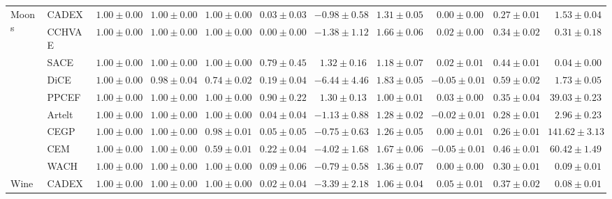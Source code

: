 \begin{table}[ht]
\begin{center}
\begin{sc}
\begin{scriptsize}
\begin{tabular}{l|l|rrrrrrrrr}
\multirow{9}{*}{Moons} & CADEX & $\boldsymbol{1.00\pm{0.00}}$ & $\boldsymbol{1.00\pm{0.00}}$ & $\boldsymbol{1.00\pm{0.00}}$ & $0.03\pm{0.03}$ & $-0.98\pm{0.58}$ & $1.31\pm{0.05}$ & $0.00\pm{0.00}$ & $0.27\pm{0.01}$ & $1.53\pm{0.04}$ \\
 & CCHVAE & $\boldsymbol{1.00\pm{0.00}}$ & $\boldsymbol{1.00\pm{0.00}}$ & $\boldsymbol{1.00\pm{0.00}}$ & $0.00\pm{0.00}$ & $-1.38\pm{1.12}$ & $1.66\pm{0.06}$ & $0.02\pm{0.00}$ & $0.34\pm{0.02}$ & $0.31\pm{0.18}$ \\
 & SACE & $\boldsymbol{1.00\pm{0.00}}$ & $\boldsymbol{1.00\pm{0.00}}$ & $\boldsymbol{1.00\pm{0.00}}$ & $0.79\pm{0.45}$ & $\boldsymbol{1.32\pm{0.16}}$ & $1.18\pm{0.07}$ & $0.02\pm{0.01}$ & $0.44\pm{0.01}$ & $\boldsymbol{0.04\pm{0.00}}$ \\
 & DiCE & $\boldsymbol{1.00\pm{0.00}}$ & $0.98\pm{0.04}$ & $0.74\pm{0.02}$ & $0.19\pm{0.04}$ & $-6.44\pm{4.46}$ & $1.83\pm{0.05}$ & $-0.05\pm{0.01}$ & $0.59\pm{0.02}$ & $1.73\pm{0.05}$ \\
 & PPCEF & $\boldsymbol{1.00\pm{0.00}}$ & $\boldsymbol{1.00\pm{0.00}}$ & $\boldsymbol{1.00\pm{0.00}}$ & $\boldsymbol{0.90\pm{0.22}}$ & $1.30\pm{0.13}$ & $\boldsymbol{1.00\pm{0.01}}$ & $\boldsymbol{0.03\pm{0.00}}$ & $0.35\pm{0.04}$ & $39.03\pm{0.23}$ \\
 & Artelt & $\boldsymbol{1.00\pm{0.00}}$ & $\boldsymbol{1.00\pm{0.00}}$ & $\boldsymbol{1.00\pm{0.00}}$ & $0.04\pm{0.04}$ & $-1.13\pm{0.88}$ & $1.28\pm{0.02}$ & $-0.02\pm{0.01}$ & $0.28\pm{0.01}$ & $2.96\pm{0.23}$ \\
 & CEGP & $\boldsymbol{1.00\pm{0.00}}$ & $\boldsymbol{1.00\pm{0.00}}$ & $0.98\pm{0.01}$ & $0.05\pm{0.05}$ & $-0.75\pm{0.63}$ & $1.26\pm{0.05}$ & $0.00\pm{0.01}$ & $\boldsymbol{0.26\pm{0.01}}$ & $141.62\pm{3.13}$ \\
 & CEM & $\boldsymbol{1.00\pm{0.00}}$ & $\boldsymbol{1.00\pm{0.00}}$ & $0.59\pm{0.01}$ & $0.22\pm{0.04}$ & $-4.02\pm{1.68}$ & $1.67\pm{0.06}$ & $-0.05\pm{0.01}$ & $0.46\pm{0.01}$ & $60.42\pm{1.49}$ \\
 & WACH & $\boldsymbol{1.00\pm{0.00}}$ & $\boldsymbol{1.00\pm{0.00}}$ & $\boldsymbol{1.00\pm{0.00}}$ & $0.09\pm{0.06}$ & $-0.79\pm{0.58}$ & $1.36\pm{0.07}$ & $0.00\pm{0.00}$ & $0.30\pm{0.01}$ & $0.09\pm{0.01}$ \\
\midrule
\multirow{9}{*}{Wine} & CADEX & $\boldsymbol{1.00\pm{0.00}}$ & $\boldsymbol{1.00\pm{0.00}}$ & $\boldsymbol{1.00\pm{0.00}}$ & $0.02\pm{0.04}$ & $-3.39\pm{2.18}$ & $1.06\pm{0.04}$ & $0.05\pm{0.01}$ & $\boldsymbol{0.37\pm{0.02}}$ & $0.08\pm{0.01}$ \\

\end{tabular}
\end{scriptsize}
\end{sc}
\end{center}
\end{table}
